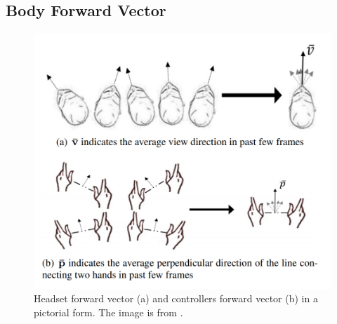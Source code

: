 \documentclass{vgtc}                          %
\begin{document}
\subsection{Body Forward Vector}
\begin{figure}[tb]
 \centering %
 \includegraphics[width=\columnwidth]{pictures/Figure View and controller forward direction.png}
 \caption{ Headset forward vector (a) and controllers forward vector (b) in a pictorial form. The image is from \cite{Real-Time}.}
 \label{fig:forwardVector}
\end{figure}
\end{document}
